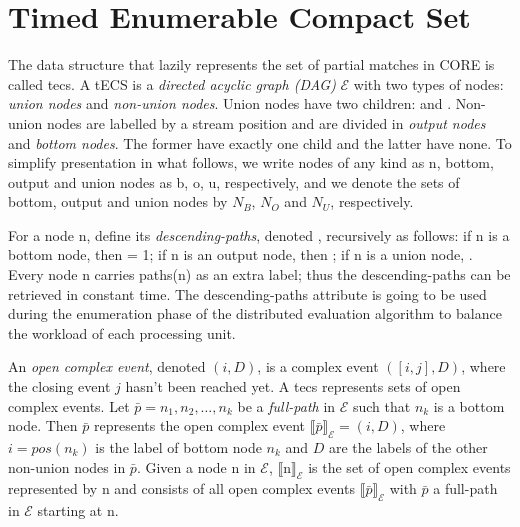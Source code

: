 \section{Timed Enumerable Compact Set}\label{sec:data_structure}

The data structure that lazily represents the set of partial matches in CORE is called \acrfull{tecs}. A tECS is a \emph{directed acyclic graph (DAG)} $\mathcal{E}$ with two types of nodes: \emph{union nodes} and \emph{non-union nodes}. Union nodes have two children:  and . Non-union nodes are labelled by a stream position and are divided in \emph{output nodes} and \emph{bottom nodes}. The former have exactly one child and the latter have none. To simplify presentation in what follows, we write nodes of any kind as \textrm{n}, bottom, output and union nodes as \textrm{b, o, u}, respectively, and we denote the sets of bottom, output and union nodes by $N_{B}$, $N_{O}$ and $N_{U}$, respectively.

For a node \textrm{n}, define its \emph{descending-paths}, denoted , recursively as follows: if \textrm{n} is a bottom node, then  = 1; if \textrm{n} is an output node, then ; if \textrm{n} is a union node, . Every node \textrm{n} carries paths(\textrm{n}) as an extra label; thus the descending-paths can be retrieved in constant time. The descending-paths attribute is going to be used during the enumeration phase of the distributed evaluation algorithm to balance the workload of each processing unit.

An \emph{open complex event}, denoted $(i, D)$, is a complex event $([i, j], D)$, where the closing event $j$ hasn't been reached yet. A \acrshort{tecs} represents sets of open complex events. Let $\bar{p} = n_{1}, n_{2}, \ldots, n_{k}$ be a \emph{full-path} in $\mathcal{E}$ such that $n_{k}$ is a bottom node. Then $\bar{p}$ represents the open complex event ${\llbracket \bar{p} \rrbracket}_{\mathcal{E}} = (i, D)$, where $i = pos(n_{k})$ is the label of bottom node $n_{k}$ and $D$ are the labels of the other non-union nodes in $\bar{p}$. Given a node \textrm{n} in $\mathcal{E}$, ${\llbracket \textrm{n} \rrbracket}_{\mathcal{E}}$ is the set of open complex events represented by \textrm{n} and consists of all open complex events ${\llbracket \bar{p} \rrbracket}_{\mathcal{E}}$ with $\bar{p}$ a full-path in $\mathcal{E}$ starting at \textrm{n}.

